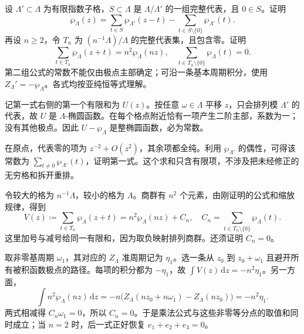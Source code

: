 \BookExercises

\begin{exercise}[子格求和与乘法公式]\label{b3:ex:22-1}
设 \(\Lambda'\subset\Lambda\) 为有限指数子格，\(S\subset\Lambda\) 是 \(\Lambda/\Lambda'\) 的一组完整代表，且 \(0\in S\)。证明
\[
 \wp_\Lambda(z)=\sum_{t\in S}\wp_{\Lambda'}(z-t)
                 -\sum_{t\in S\setminus\{0\}}\wp_{\Lambda'}(t).
\]
再设 \(n\ge2\)，令 \(T_n\) 为 \((n^{-1}\Lambda)/\Lambda\) 的完整代表集，且包含零。证明
\[
 \sum_{t\in T_n}\wp_\Lambda(z+t)=n^2\wp_\Lambda(nz),\quad
 \sum_{t\in T_n\setminus\{0\}}\wp_\Lambda(t)=0.
\]
第二组公式的常数不能仅由极点主部确定；可沿一条基本周期积分，使用 \(Z_\Lambda'=-\wp_\Lambda\)。各式均按亚纯恒等式理解。
\end{exercise}
\begin{solution}
记第一式右侧的第一个有限和为 \(U(z)\)。按任意 \(\omega\in\Lambda\) 平移 \(z\)，只会排列模 \(\Lambda'\) 的代表，故 \(U\) 是 \(\Lambda\)-椭圆函数。在每个格点附近恰有一项产生二阶主部，系数为一；没有其他极点。因此 \(U-\wp_\Lambda\) 是整椭圆函数，必为常数。

在原点，代表零的项为 \(z^{-2}+O(z^2)\)，其余项都全纯。利用 \(\wp_{\Lambda'}\) 的偶性，可得该常数为
\(\sum_{t\ne0}\wp_{\Lambda'}(t)\)，证明第一式。这个求和只含有限项，不涉及把未经修正的无穷格和拆开重排。

令较大的格为 \(n^{-1}\Lambda\)，较小的格为 \(\Lambda\)。商群有 \(n^2\) 个元素，由刚证明的公式和缩放规律，得到
\[
 V(z)\coloneqq\sum_{t\in T_n}\wp_\Lambda(z+t)
 =n^2\wp_\Lambda(nz)+C_n,\quad
 C_n=\sum_{t\in T_n\setminus\{0\}}\wp_\Lambda(t).
\]
这里加号与减号给同一有限和，因为取负映射排列商群。还须证明 \(C_n=0\)。

取非零基周期 \(\omega_1\)，其对应的 \(Z_\Lambda\) 准周期记为 \(\eta_1\)。选一条从 \(z_0\) 到 \(z_0+\omega_1\) 且避开所有被积函数极点的路径。每项的积分都为 \(-\eta_1\)，故 \(\int V(z)\,\mathrm{d}z=-n^2\eta_1\)。另一方面，
\[
 \int n^2\wp_\Lambda(nz)\,\mathrm{d}z
 =-n\bigl(Z_\Lambda(nz_0+n\omega_1)-Z_\Lambda(nz_0)\bigr)
 =-n^2\eta_1.
\]
两式相减得 \(C_n\omega_1=0\)，所以 \(C_n=0\)。于是乘法公式与这些非零等分点的取值和同时成立；当 \(n=2\) 时，后一式正好恢复 \(e_1+e_2+e_3=0\)。
\end{solution}

